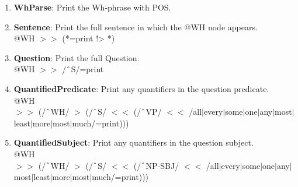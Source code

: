 \begin{enumerate}
    \item \textbf{WhParse}: Print the Wh-phrase with POS.

    \item \textbf{Sentence}: Print the full sentence in which the @WH node appears.\\
    @WH $>\!\!>$ (*=print !> *)

    \item \textbf{Question}: Print the full Question.\\
    @WH $>\!\!>$ /$\string^$S/=print

    \item \textbf{QuantifiedPredicate}: Print any quantifiers in the question predicate.\\
    @WH \\
    $>\!\!>$ (/$\string^$WH/ $>$ (/$\string^$S/ $<\!\!<$ (/$\string^$VP/ $<\!\!<$ /all$|$every$|$some$|$one$|$any$|$most$|$least$|$more$|$most$|$much/=print)))

    \item \textbf{QuantifiedSubject}: Print any quantifiers in the question subject.\\
    @WH \\
    $>\!\!>$ (/$\string^$WH/ $>$ (/$\string^$S/ $<\!\!<$ (/$\string^$NP-SBJ/ $<\!\!<$ /all$|$every$|$some$|$one$|$any$|$most$|$least$|$more$|$most$|$much/=print)))

\end{enumerate}




